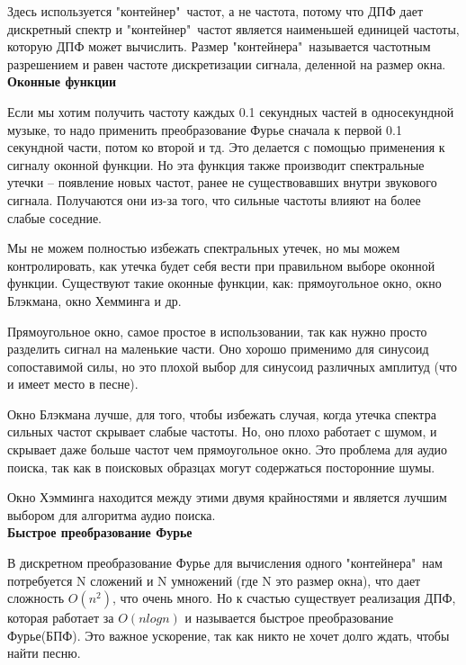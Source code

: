 Здесь используется "контейнер"\, частот, а не частота, потому что ДПФ дает дискретный спектр и "контейнер"\, частот является наименьшей единицей частоты, которую ДПФ может вычислить. Размер "контейнера"\, называется частотным разрешением и равен частоте дискретизации сигнала, деленной на размер окна.\\

\noindent \textbf{Оконные функции}

Если мы хотим получить частоту каждых 0.1 секундных частей в односекундной музыке, то надо применить преобразование Фурье сначала к первой 0.1 секундной части, потом ко второй и тд. Это делается с помощью применения к сигналу оконной функции. Но эта функция также производит спектральные утечки -- появление новых частот, ранее не существовавших внутри звукового сигнала. Получаются они из-за того, что сильные частоты влияют на более слабые соседние.

Мы не можем полностью избежать спектральных утечек, но мы можем контролировать, как утечка будет себя вести при правильном выборе оконной функции. Существуют такие оконные функции, как: прямоугольное окно, окно Блэкмана, окно Хемминга и др.

Прямоугольное окно, самое простое в использовании, так как нужно просто разделить сигнал на маленькие части. Оно хорошо применимо для синусоид сопоставимой силы, но это плохой выбор для синусоид различных амплитуд (что и имеет место в песне).

Окно Блэкмана лучше, для того, чтобы избежать случая, когда утечка спектра сильных частот скрывает слабые частоты. Но, оно плохо работает с шумом, и скрывает даже больше частот чем прямоугольное окно. Это проблема для аудио поиска, так как в поисковых образцах могут содержаться посторонние шумы.

Окно Хэмминга находится между этими двумя крайностями и является лучшим выбором для алгоритма аудио поиска.\\

\noindent \textbf{Быстрое преобразование Фурье}

В дискретном преобразование Фурье для вычисления одного "контейнера"\, нам потребуется N сложений и N умножений (где N это размер окна), что дает сложность $O(n^2)$, что очень много. Но к счастью существует реализация ДПФ, которая работает за $O(nlogn)$ и называется быстрое преобразование Фурье(БПФ). Это важное ускорение, так как никто не хочет долго ждать, чтобы найти песню.\\

